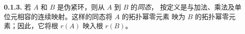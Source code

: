 \medskip
\noindent\textbf{0.1.3.}
\label{sga3:VIIB:0.1.3}
若 \(A\) 和 \(B\) 是伪紧环，则从 \(A\) 到 \(B\) 的\emph{同态}，
按定义是与加法、乘法及单位元相容的连续映射。这样的同态将 \(A\) 的拓扑幂零元素
映为 \(B\) 的拓扑幂零元素；因此，它将根 \(r(A)\) 映入根 \(r(B)\)。

